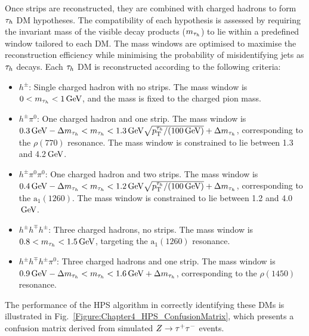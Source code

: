 Once strips are reconstructed, they are combined with charged hadrons to form $\tau_h$ \ac{DM} hypotheses. The compatibility of each hypothesis is assessed by requiring the invariant mass of the visible decay products ($m_{\tau_h}$) to lie within a predefined window tailored to each \ac{DM}. The mass windows are optimised to maximise the reconstruction efficiency while minimising the probability of misidentifying jets as $\tau_h$ decays. Each $\tau_h$ \ac{DM} is reconstructed according to the following criteria:

\begin{itemize}
    \item \textbf{$h^\pm$}: Single charged hadron with no strips. The mass window is $0 < m_{\tau_h} < 1\,\text{Ge\hspace{-.08em}V}$, and the mass is fixed to the charged pion mass.
    \item \textbf{$h^\pm \pi^0$}: One charged hadron and one strip. The mass window is $0.3\,\text{Ge\hspace{-.08em}V} - \Delta m_{\tau_h} < m_{\tau_h} < 1.3\,\text{Ge\hspace{-.08em}V}\sqrt{p_\mathrm{T}^{\tau_h}/(100\,\text{Ge\hspace{-.08em}V})} + \Delta m_{\tau_h}$, corresponding to the $\rho(770)$ resonance. The mass window is constrained to lie between 1.3 and 4.2$\,\text{Ge\hspace{-.08em}V}$.
    \item \textbf{$h^\pm \pi^0 \pi^0$}: One charged hadron and two strips. The mass window is $0.4\,\text{Ge\hspace{-.08em}V} - \Delta m_{\tau_h} < m_{\tau_h} < 1.2\,\text{Ge\hspace{-.08em}V}\sqrt{p_\mathrm{T}^{\tau_h}/(100\,\text{Ge\hspace{-.08em}V})} + \Delta m_{\tau_h}$, corresponding to the $\mathrm{a}_1(1260)$. The mass window is constrained to lie between 1.2 and 4.0$\,\text{Ge\hspace{-.08em}V}$.
    \item \textbf{$h^\pm h^\mp h^\pm$}: Three charged hadrons, no strips. The mass window is $0.8 < m_{\tau_h} < 1.5\,\text{Ge\hspace{-.08em}V}$, targeting the $\mathrm{a}_1(1260)$ resonance.
    \item \textbf{$h^\pm h^\mp h^\pm \pi^0$}: Three charged hadrons and one strip. The mass window is $0.9\,\text{Ge\hspace{-.08em}V} - \Delta m_{\tau_h}< m_{\tau_h} < 1.6\,\text{Ge\hspace{-.08em}V} + \Delta m_{\tau_h}$, corresponding to the $\rho(1450)$ resonance.
\end{itemize}

The performance of the \ac{HPS} algorithm in correctly identifying these \acp{DM} is illustrated in Fig.~\ref{Figure:Chapter4_HPS_ConfusionMatrix}, which presents a confusion matrix derived from simulated $Z \rightarrow \tau^+ \tau^-$ events. 


